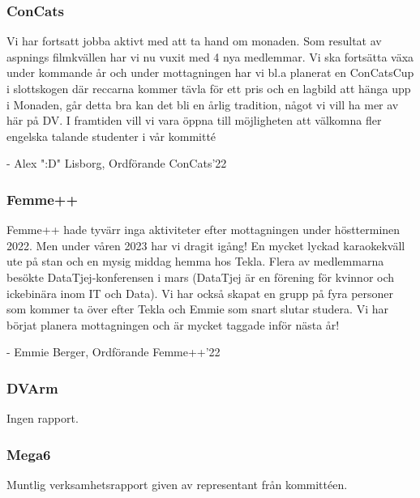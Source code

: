 \documentclass[protokoll]{dvd}
\begin{document}
\subsubsection*{ConCats}
Vi har fortsatt jobba aktivt med att ta hand om monaden.
Som resultat av aspnings filmkvällen har vi nu vuxit med 4 nya medlemmar. 
Vi ska fortsätta växa under kommande år och under mottagningen har vi
bl.a planerat en ConCatsCup i slottskogen där reccarna kommer tävla för
ett pris och en lagbild att hänga upp i Monaden, går detta bra kan 
det bli en årlig tradition, något vi vill ha mer av här på DV. I framtiden
vill vi vara öppna till möjligheten att välkomna fler engelska talande studenter i vår kommitté

- Alex ":D" Lisborg, Ordförande ConCats'22

\subsubsection*{Femme++}
Femme++ hade tyvärr inga aktiviteter efter mottagningen under höstterminen 2022.
Men under våren 2023 har vi dragit igång! En mycket lyckad karaokekväll ute på stan och en mysig middag hemma hos Tekla.
Flera av medlemmarna besökte DataTjej-konferensen i mars (DataTjej är en förening för kvinnor och ickebinära inom IT och Data).
Vi har också skapat en grupp på fyra personer som kommer ta över efter Tekla och Emmie som snart slutar studera.
Vi har börjat planera mottagningen och är mycket taggade inför nästa år!

- Emmie Berger, Ordförande Femme++'22

\subsubsection*{DVArm}
Ingen rapport.

\subsubsection*{Mega6}
Muntlig verksamhetsrapport given av representant från kommittéen.
\end{document}
